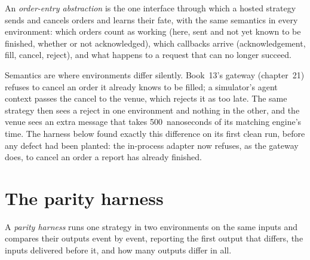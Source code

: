 \begin{definition}\label{def:pl:simulation-production-parity:oe}
An \emph{order-entry abstraction} is the one interface through which a hosted strategy sends and cancels
orders and learns their fate, with the same semantics in every environment: which orders count as working (here, sent and not yet known to
be finished, whether or not acknowledged), which callbacks arrive (acknowledgement, fill, cancel, reject), and what happens to a request that
can no longer succeed.
\end{definition}

Semantics are where environments differ silently. Book~13's gateway (chapter~21) refuses to cancel an order it already knows to be filled;
a simulator's agent context passes the cancel to the venue, which rejects it as too late. The same strategy then sees a reject in one
environment and nothing in the other, and the venue sees an extra message that takes 500~nanoseconds of its matching engine's time. The
harness below found exactly this difference on its first clean run, before any defect had been planted: the in-process adapter now refuses,
as the gateway does, to cancel an order a report has already finished.

\label{lst:pl:simulation-production-parity:host}

\label{lst:pl:simulation-production-parity:prod}

\section{The parity harness}

\begin{definition}\label{def:pl:simulation-production-parity:harness}
A \emph{parity harness} runs one strategy in two environments on the same inputs and compares their outputs
event by event, reporting the first output that differs, the inputs delivered before it, and how many outputs differ in all.
\end{definition}


